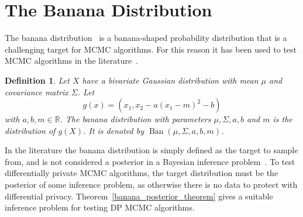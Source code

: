 \documentclass[english,twoside,openright]{HYgraduMLDS}
\newtheorem{definition}{Definition}
\newcommand{\R}{\mathbb{R}}
\DeclareMathOperator{\ban}{Ban}
\begin{document}
\section{The Banana Distribution}

The banana distribution~\cite{TPK14} is a banana-shaped probability 
distribution that is a challenging target for MCMC algorithms. For this reason it has 
been used to test MCMC algorithms in the literature~\cite{TPK14}. 

\begin{definition}
    Let \(X\) have a bivariate Gaussian distribution with
    mean \(\mu\) and covariance matrix \(\Sigma\). Let
    \[
        g(x) = (x_1, x_2 - a(x_1 - m)^2 - b)
    \]
    with \(a, b, m \in \R\).
    The banana distribution with parameters \(\mu, \Sigma, a, b\) and \(m\)
    is the distribution of \(g(X)\). It is denoted by 
    \(\ban(\mu, \Sigma, a, b, m)\).
\end{definition}

In the literature the banana distribution is simply defined as the target to 
sample from, and is not considered a posterior in a Bayesian inference 
problem~\cite{TPK14}. To test differentially private MCMC algorithms, the 
target distribution must be the posterior of some inference problem, as 
otherwise there is no data to protect with differential privacy.
Theorem~\ref{banana_posterior_theorem} gives a suitable inference problem 
for testing DP MCMC algorithms.
\end{document}
